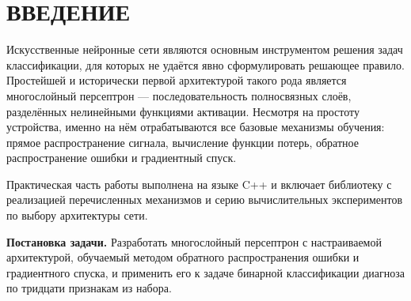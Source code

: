 \chapter{ВВЕДЕНИЕ}

Искусственные нейронные сети являются основным инструментом решения задач
классификации, для которых не удаётся явно сформулировать решающее правило. Простейшей
и исторически первой архитектурой такого рода является многослойный персептрон ---
последовательность полносвязных слоёв, разделённых нелинейными функциями активации.
Несмотря на простоту устройства, именно на нём отрабатываются все базовые механизмы
обучения: прямое распространение сигнала, вычисление функции потерь, обратное
распространение ошибки и градиентный спуск.

Практическая часть работы выполнена на языке C++ и включает библиотеку с реализацией
перечисленных механизмов и
серию вычислительных экспериментов по выбору архитектуры сети.

\textbf{Постановка задачи.} Разработать многослойный персептрон с настраиваемой
архитектурой, обучаемый методом обратного распространения ошибки и градиентного спуска,
и применить его к задаче бинарной классификации диагноза по тридцати признакам
 из набора.
